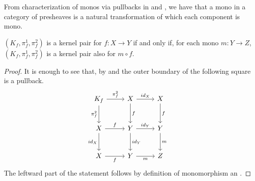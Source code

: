 \documentclass[runningheads,envcountsect]{llncs}
\begin{document}
\begin{remark}\label{rem:monos_in_presh_cats}
    From characterization of monos via pullbacks in  and , we have that a mono in a category of presheaves is a natural transformation of which each component is mono.
\end{remark}

\begin{corollary}\label{cor:kermono}
	$(K_f, \pi_f^1, \pi_f^2)$ is a kernel pair for $f\colon X\to Y$ if and only if, for each mono $m\colon Y\to Z$, $(K_f, \pi_f^1, \pi_f^2)$ is a kernel pair also for $m\circ f$.
\end{corollary}
\begin{proof}
    It is enough to see that, by  and  the outer boundary of the following square is a pullback.
        \[\begin{tikzcd}[row sep=13 pt, column sep=13 pt]
    	{K_f} && X && X \\
    	\\
    	X && Y && Y \\
    	\\
    	X && Y && Z
    	\arrow["{\pi_f^2}", from=1-1, to=1-3]
    	\arrow["{\pi_f^2}"', from=1-1, to=3-1]
    	\arrow["{id_X}", from=1-3, to=1-5]
    	\arrow["f", from=1-3, to=3-3]
    	\arrow["f", from=1-5, to=3-5]
    	\arrow["f", from=3-1, to=3-3]
    	\arrow["{id_X}"', from=3-1, to=5-1]
    	\arrow["{id_Y}", from=3-3, to=3-5]
    	\arrow["{id_Y}", from=3-3, to=5-3]
    	\arrow["m", from=3-5, to=5-5]
    	\arrow["f"', from=5-1, to=5-3]
    	\arrow["m"', from=5-3, to=5-5]
    \end{tikzcd}\]
    The leftward part of the statement follows by definition of monomorphism an .
\end{proof}
\end{document}
